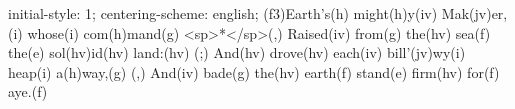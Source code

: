 initial-style: 1;
centering-scheme: english;
(f3)Earth's(h) might(h)y(iv) Mak(jv)er,(i) whose(i) com(h)mand(g) <sp>*</sp>(,)
Raised(iv) from(g) the(hv) sea(f) the(e) sol(hv)id(hv) land:(hv) (;)
And(hv) drove(hv) each(iv) bill'(jv)wy(i) heap(i) a(h)way,(g) (,)
And(iv) bade(g) the(hv) earth(f) stand(e) firm(hv) for(f) aye.(f)
